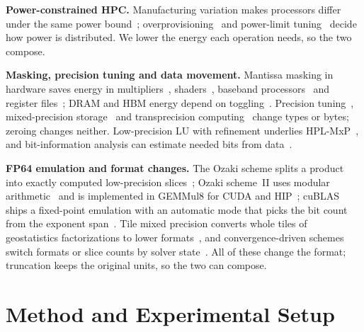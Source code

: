 \documentclass[conference]{IEEEtran}
\begin{document}
\textbf{Power-constrained HPC.} Manufacturing variation makes processors differ under the same power
bound~\cite{Rountree2012,Inadomi2015}; overprovisioning~\cite{Patki2013} and power-limit tuning~\cite{Zeus2023} decide
how power is distributed. We lower the energy each operation needs, so the two compose.

\textbf{Masking, precision tuning and data movement.} Mantissa masking in hardware saves energy in
multipliers~\cite{Tong2000}, shaders~\cite{Pool2008,Pool2011,Angerd2017}, baseband processors~\cite{Guenther2016} and
register files~\cite{Jahadi2024}; DRAM and HBM energy depend on toggling~\cite{Chatterjee2017,OConnor2017,Ghose2018}. Precision
tuning~\cite{RubioGonzalez2013}, mixed-precision storage~\cite{Higham2022,Grutzmacher2020} and transprecision
computing~\cite{Malossi2018} change types or bytes; zeroing changes neither. Low-precision LU with refinement underlies
HPL-MxP~\cite{Haidar2018,Dongarra2025}, and bit-information analysis can estimate needed bits from data~\cite{Klower2021}.

\textbf{FP64 emulation and format changes.} The Ozaki scheme splits a product into exactly computed low-precision
slices~\cite{Ozaki2012,Ootomo2024}; Ozaki scheme~II uses modular arithmetic~\cite{Ozaki2025} and is implemented in
GEMMul8 for CUDA and HIP~\cite{Uchino2025}; cuBLAS ships a fixed-point emulation with an automatic mode that picks the
bit count from the exponent span~\cite{cuBLASEmu,Schwarz2026}. Tile mixed precision converts whole tiles of geostatistics
factorizations to lower formats~\cite{Abdulah2019,Abdulah2022,Cao2022,Cao2023,Ren2025}, and convergence-driven schemes
switch formats or slice counts by solver state~\cite{Woo2023,Huang2026}. All of these change the format; truncation keeps
the original units, so the two can compose.

\section{Method and Experimental Setup}\label{sec:setup}
\end{document}

